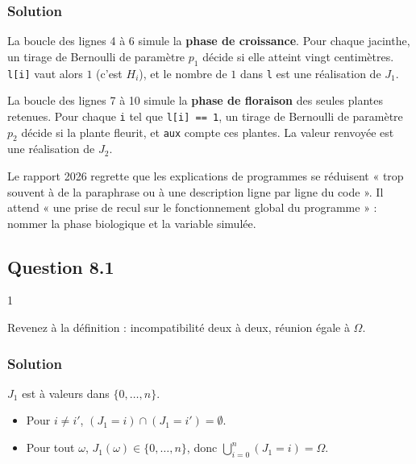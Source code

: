 \documentclass[11pt,a4paper]{article}
\providecommand{\tightlist}{\setlength{\itemsep}{0pt}\setlength{\parskip}{0pt}}
\providecommand{\varnothing}{\emptyset}
\begin{document}
\hypertarget{solution-13}{%
\subsubsection{Solution}\label{solution-13}}

La boucle des lignes 4 à 6 simule la \textbf{phase de croissance}. Pour chaque jacinthe, un tirage de Bernoulli de paramètre \(p_1\) décide si elle atteint vingt centimètres. \texttt{l{[}i{]}} vaut alors \(1\) (c'est \(H_i\)), et le nombre de \(1\) dans \texttt{l} est une réalisation de \(J_1\).

La boucle des lignes 7 à 10 simule la \textbf{phase de floraison} des seules plantes retenues. Pour chaque \texttt{i} tel que \texttt{l{[}i{]}\ ==\ 1}, un tirage de Bernoulli de paramètre \(p_2\) décide si la plante fleurit, et \texttt{aux} compte ces plantes. La valeur renvoyée est une réalisation de \(J_2\).

\begin{jury}

Le rapport 2026 regrette que les explications de programmes se réduisent « trop souvent à de la paraphrase ou à une description ligne par ligne du code ». Il attend « une prise de recul sur le fonctionnement global du programme » : nommer la phase biologique et la variable simulée.

\end{jury}

\hypertarget{question-8.1}{%
\subsection{Question 8.1}\label{question-8.1}}

\begin{indication}{1}

Revenez à la définition : incompatibilité deux à deux, réunion égale à \(\Omega\).

\end{indication}

\hypertarget{solution-14}{%
\subsubsection{Solution}\label{solution-14}}

\(J_1\) est à valeurs dans \(\{0,\dots,n\}\).

\begin{itemize}
\tightlist
\item
  Pour \(i\ne i'\), \((J_1=i)\cap(J_1=i')=\varnothing\).
\item
  Pour tout \(\omega\), \(J_1(\omega)\in\{0,\dots,n\}\), donc \(\bigcup_{i=0}^n(J_1=i)=\Omega\).
\end{itemize}
\end{document}

